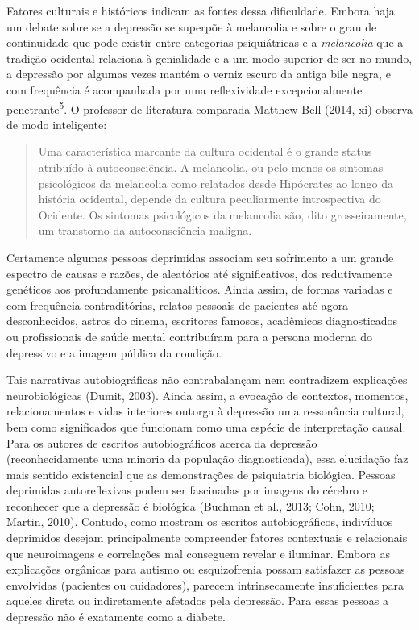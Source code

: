 Fatores culturais e históricos indicam as fontes dessa dificuldade.
Embora haja um debate sobre se a depressão se superpõe à melancolia e
sobre o grau de continuidade que pode existir entre categorias
psiquiátricas e a \emph{melancolia} que a tradição ocidental relaciona à
genialidade e a um modo superior de ser no mundo, a depressão por
algumas vezes mantém o verniz escuro da antiga bile negra, e com
frequência é acompanhada por uma reflexividade excepcionalmente
penetrante\textsuperscript{5}. O professor de literatura comparada
Matthew Bell (2014, xi) observa de modo inteligente:

\begin{quote}
Uma característica marcante da cultura ocidental é o grande status
atribuído à autoconsciência. A melancolia, ou pelo menos os sintomas
psicológicos da melancolia como relatados desde Hipócrates ao longo da
história ocidental, depende da cultura peculiarmente introspectiva do
Ocidente. Os sintomas psicológicos da melancolia são, dito
grosseiramente, um transtorno da autoconsciência maligna.
\end{quote}

Certamente algumas pessoas deprimidas associam seu sofrimento a um
grande espectro de causas e razões, de aleatórios até significativos,
dos redutivamente genéticos aos profundamente psicanalíticos. Ainda
assim, de formas variadas e com frequência contraditórias, relatos
pessoais de pacientes até agora desconhecidos, astros do cinema,
escritores famosos, acadêmicos diagnosticados ou profissionais de saúde
mental contribuíram para a persona moderna do depressivo e a imagem
pública da condição.

Tais narrativas autobiográficas não contrabalançam nem contradizem
explicações neurobiológicas (Dumit, 2003). Ainda assim, a evocação de
contextos, momentos, relacionamentos e vidas interiores outorga à
depressão uma ressonância cultural, bem como significados que funcionam
como uma espécie de interpretação causal. Para os autores de escritos
autobiográficos acerca da depressão (reconhecidamente uma minoria da
população diagnosticada), essa elucidação faz mais sentido existencial
que as demonstrações de psiquiatria biológica. Pessoas deprimidas
autoreflexivas podem ser fascinadas por imagens do cérebro e reconhecer
que a depressão é biológica (Buchman et al., 2013; Cohn, 2010; Martin,
2010). Contudo, como mostram os escritos autobiográficos, indivíduos
deprimidos desejam principalmente compreender fatores contextuais e
relacionais que neuroimagens e correlações mal conseguem revelar e
iluminar. Embora as explicações orgânicas para autismo ou esquizofrenia
possam satisfazer as pessoas envolvidas (pacientes ou cuidadores),
parecem intrinsecamente insuficientes para aqueles direta ou
indiretamente afetados pela depressão. Para essas pessoas a depressão
não é exatamente como a diabete.

